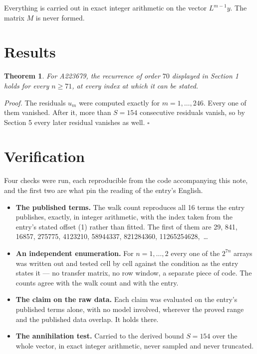 \documentclass[11pt]{article}
\newtheorem{theorem}{Theorem}
\theoremstyle{definition}
\begin{document}
Everything is carried out in exact integer arithmetic on the vector $L^{m-1}y$. The matrix $M$ is never formed.

\section{Results}

\begin{theorem} For A223679, the recurrence of order $70$ displayed in Section 1 holds for every $n \ge 71$, at every index at which it can be stated.\end{theorem}

{\itshape Proof.} The residuals $u_m$ were computed exactly for $m = 1,\dots,246$. Every one of them vanished. After it, more than $S = 154$ consecutive residuals vanish, so by Section 5 every later residual vanishes as well. $\square$

\section{Verification}

Four checks were run, each reproducible from the code accompanying this note, and the first two are what pin the reading of the entry's English.

\begin{itemize}

\item {\bfseries The published terms.} The walk count reproduces all 16 terms the entry publishes, exactly, in integer arithmetic, with the index taken from the entry's stated offset (1) rather than fitted. The first of them are 29, 841, 16857, 275775, 4123210, 58944337, 821284360, 11265254628,~\dots

\item {\bfseries An independent enumeration.} For $n = 1,\dots,2$ every one of the $2^{7n}$ arrays was written out and tested cell by cell against the condition as the entry states it --- no transfer matrix, no row window, a separate piece of code. The counts agree with the walk count and with the entry.

\item {\bfseries The claim on the raw data.} Each claim was evaluated on the entry's published terms alone, with no model involved, wherever the proved range and the published data overlap. It holds there.

\item {\bfseries The annihilation test.} Carried to the derived bound $S = 154$ over the whole vector, in exact integer arithmetic, never sampled and never truncated.

\end{itemize}
\end{document}

